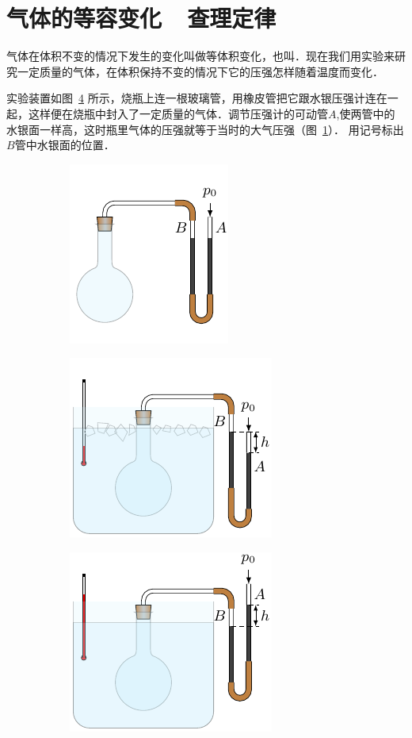 \section{气体的等容变化~~查理定律}
气体在体积不变的情况下发生的变化叫做等体积变化，也叫．现在我们用实验来研究一定质量的气体，在体积保持不变的情况下它的压强怎样随着温度而变化．


实验装置如图~\ref{fig_B_3-9} 所示，烧瓶上连一根玻璃管，用橡皮管把它跟水银压强计连在一起，这样便在烧瓶中封入了一定质量的气体．调节压强计的可动管$A$,使两管中的水银面一样高，这时瓶里气体的压强就等于当时的大气压强（图~\ref{fig_B_3-9a}）．
用记号标出$B$管中水银面的位置．


\begin{figure}[htbp]
	\centering
	\begin{subfigure}{0.3\linewidth}
		\centering
		\includegraphics{fig/B/3-9a.pdf}
		\caption{}\label{fig_B_3-9a}
	\end{subfigure}
	\hfil
	\begin{subfigure}{0.3\linewidth}
		\centering
		\includegraphics{fig/B/3-9b.pdf}
		\caption{}\label{fig_B_3-9b}
	\end{subfigure}
	\hfil
	\begin{subfigure}{0.3\linewidth}
		\centering
		\includegraphics{fig/B/3-9c.pdf}
		\caption{}\label{fig_B_3-9c}
	\end{subfigure}
	\caption{}\label{fig_B_3-9}
\end{figure}


